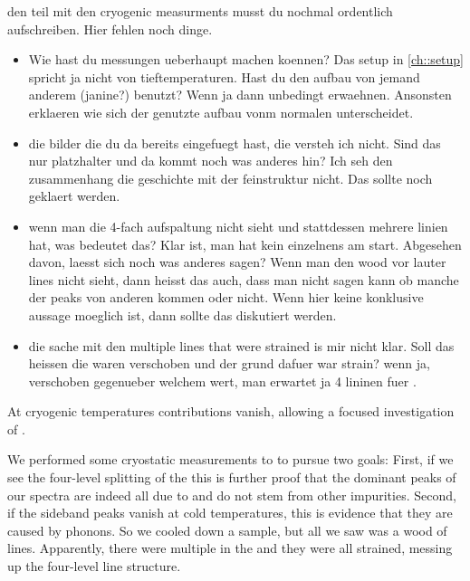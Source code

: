 			\begin{remark}

				den teil mit den cryogenic measurments musst du nochmal ordentlich aufschreiben. Hier fehlen noch dinge.

				\begin{itemize}
					\item Wie hast du messungen ueberhaupt machen koennen? Das setup in \autoref{ch::setup} spricht ja nicht von tieftemperaturen. Hast du den aufbau von jemand anderem (janine?) benutzt? Wenn ja dann unbedingt erwaehnen. Ansonsten erklaeren wie sich der genutzte aufbau vonm normalen unterscheidet.
					\item die bilder die du da bereits eingefuegt hast, die versteh ich  nicht. Sind das nur platzhalter und da kommt noch was anderes hin? Ich seh den zusammenhang die geschichte mit der feinstruktur nicht. Das sollte noch geklaert werden.
					\item wenn man die 4-fach aufspaltung nicht sieht und stattdessen mehrere linien hat, was bedeutet das? Klar ist, man hat kein einzelnens \siv am start. Abgesehen davon, laesst sich noch was anderes sagen? Wenn man den wood vor lauter lines nicht sieht, dann heisst das auch, dass man nicht sagen kann ob manche der \psb peaks von anderen \sivs kommen oder nicht. Wenn hier keine konklusive aussage moeglich ist, dann sollte das diskutiert werden. 
					\item die sache mit den multiple lines that were strained is mir nicht klar. Soll das heissen die waren verschoben und der grund dafuer war strain? wenn ja, verschoben gegenueber welchem wert, man erwartet ja 4 lininen fuer \sivs.
				\end{itemize}
			\end{remark}

			At cryogenic temperatures \psb contributions vanish, allowing a focused investigation of \zpls. 

			We performed some cryostatic measurements to to pursue two goals:
			First, if we see the four-level splitting of the \ZPL this is further proof that the dominant peaks of our spectra are indeed all due to \sivs and do not stem from other impurities.
			Second, if the sideband peaks vanish at cold temperatures, this is evidence that they are caused by phonons.
			So we cooled down a sample, but all we saw was a wood of lines.
			Apparently, there were multiple \sivs in the \nds and they were all strained, messing up the four-level line structure.
